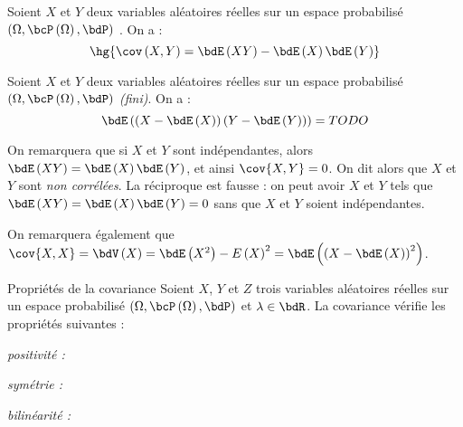\documentclass[a4paper,french,bookmarks]{article}
\begin{document}
\begin{property}{}{}
    Soient $X$ et $Y$ deux variables aléatoires réelles sur un espace probabilisé $\left(\Omega, \bcP\left(\Omega\right), \bdP \right)$ . On a :
    \[ \hg{\cov\left(X, Y\right) = \bdE\left(XY\right) - \bdE\left(X\right)\bdE\left(Y\right)}\]
\end{property}

\begin{nproof}
     Soient $X$ et $Y$ deux variables aléatoires réelles sur un espace probabilisé $\left(\Omega, \bcP\left(\Omega\right), \bdP \right)$ {\itshape (fini)}. On a :
     \[ \bdE\left(\left(X - \bdE\left(X\right)\right)\left(Y - \bdE\left(Y\right)\right)\right) = TODO\]
\end{nproof}

On remarquera que si $X$ et $Y$ sont indépendantes, alors $\bdE\left(XY\right) = \bdE\left(X\right)\bdE\left(Y\right)$, et ainsi $\cov{X, Y} = 0$. On dit alors que $X$ et $Y$ sont \textit{non corrélées}. La réciproque est fausse : on peut avoir $X$ et $Y$ tels que  $\bdE\left(XY\right) = \bdE\left(X\right)\bdE\left(Y\right) = 0$ sans que $X$ et $Y$ soient indépendantes.

On remarquera également que $\cov{X, X} = \bdV\left(X\right) = \bdE\left(X^2\right) - E\left(X\right)^2 = \bdE\left(\left(X - \bdE\left(X\right)\right)^2\right)$.

\begin{property}{Propriétés de la covariance}{}
    Soient $X$, $Y$ et $Z$ trois variables aléatoires réelles sur un espace probabilisé $\left(\Omega, \bcP\left(\Omega\right), \bdP \right)$  et $\lambda \in \bdR$. La covariance vérifie les propriétés suivantes :
    \begin{psse}
        \item \textit{positivité :} \qquad {}
        
        \item \textit{symétrie :} \qquad {}
        
        \item \textit{bilinéarité : } \qquad \begin{enumerate}
            \itb {}
            \itb {}
        \end{enumerate}
    \end{psse}
\end{property}
\end{document}
